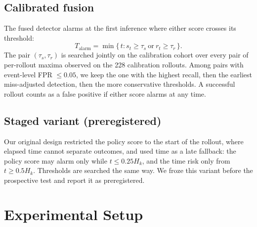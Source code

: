 \documentclass[conference,a4paper]{IEEEtran}
\begin{document}
\subsection{Calibrated fusion}

The fused detector alarms at the first inference where either score crosses its threshold:
\begin{equation}
  T_{\text{alarm}} = \min \{\, t : s_t \ge \tau_s \ \text{or}\ r_t \ge \tau_r \,\}.
\end{equation}
The pair $(\tau_s, \tau_r)$ is searched jointly on the calibration cohort over every pair
of per-rollout maxima observed on the 228 calibration rollouts. Among pairs with event-level FPR
$\le 0.05$, we keep the one with the highest recall, then the earliest miss-adjusted
detection, then the more conservative thresholds. A successful rollout counts as a false
positive if either score alarms at any time.

\subsection{Staged variant (preregistered)}

Our original design restricted the policy score to the start of the rollout, where elapsed
time cannot separate outcomes, and used time as a late fallback: the policy score may alarm
only while $t \le 0.25 H_k$, and the time risk only from $t \ge 0.5 H_k$. Thresholds are
searched the same way. We froze this variant before the prospective test and report it as
preregistered.

\section{Experimental Setup}
\end{document}
